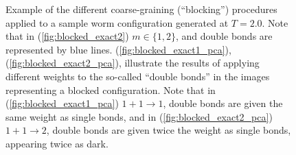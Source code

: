 \documentclass[../main.tex]{subfiles}
\begin{document}
\begin{figure}[htpb]
    \centering
    \hfill
    \centering
    \hfill
    \hfill
    \caption{Example of the different coarse-graining (``blocking'') procedures
      applied to a sample worm configuration generated at $T = 2.0$. Note that
      in (\ref{fig:blocked_exact2}) $m \in \{1, 2\}$, and double bonds are
      represented by blue lines.  (\ref{fig:blocked_exact1_pca}),
      (\ref{fig:blocked_exact2_pca}), illustrate the results of applying
      different weights to the so-called ``double bonds'' in the images
      representing a blocked configuration. Note that in
      (\ref{fig:blocked_exact1_pca}) $1+1\rightarrow 1$, double bonds are given
      the same weight as single bonds, and in (\ref{fig:blocked_exact2_pca})
    $1+1\rightarrow 2$, double bonds are given twice the weight as single
  bonds, appearing twice as dark.}\label{fig:double_bond_weights}%
\label{fig:alt_blockings}
\end{figure}
%
%
\end{document}
